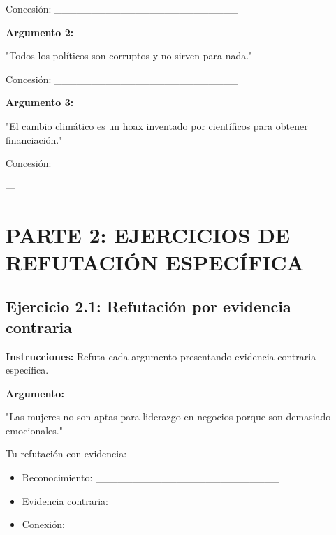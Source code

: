 \documentclass[a4paper,11pt]{article}
\begin{document}
Concesión: _________________________

\vspace{0.2cm}

\textbf{Argumento 2:}

"Todos los políticos son corruptos y no sirven para nada."

\vspace{0.2cm}

Concesión: _________________________

\vspace{0.2cm}

\textbf{Argumento 3:}

"El cambio climático es un hoax inventado por científicos para obtener financiación."

\vspace{0.2cm}

Concesión: _________________________

\vspace{0.2cm}

---

\vspace{0.2cm}

\section{PARTE 2: EJERCICIOS DE REFUTACIÓN ESPECÍFICA}

\vspace{0.2cm}

\subsection{Ejercicio 2.1: Refutación por evidencia contraria}

\vspace{0.2cm}

\textbf{Instrucciones:} Refuta cada argumento presentando evidencia contraria específica.

\vspace{0.2cm}

\textbf{Argumento:}

"Las mujeres no son aptas para liderazgo en negocios porque son demasiado emocionales."

\vspace{0.2cm}

Tu refutación con evidencia:

\begin{itemize}

  \item Reconocimiento: _________________________

  \item Evidencia contraria: _________________________

  \item Conexión: _________________________

\end{itemize}
\end{document}
